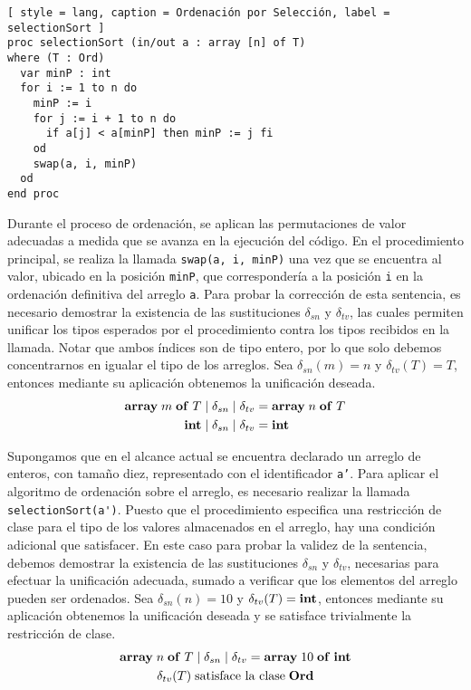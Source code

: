 \begin{lstlisting}[ style = lang, caption = Ordenación por Selección, label = selectionSort ]
proc selectionSort (in/out a : array [n] of T)
where (T : Ord)
  var minP : int
  for i := 1 to n do
    minP := i
    for j := i + 1 to n do
      if a[j] < a[minP] then minP := j fi
    od
    swap(a, i, minP)
  od
end proc
\end{lstlisting}

Durante el proceso de ordenación, se aplican las permutaciones de valor adecuadas a medida que se avanza en la ejecución del código.
En el procedimiento principal, se realiza la llamada \lstinline[style = lang]{swap(a, i, minP)} una vez que se encuentra al valor, ubicado en la posición \texttt{minP}, que correspondería a la posición \texttt{i} en la ordenación definitiva del arreglo \texttt{a}.
Para probar la corrección de esta sentencia, es necesario demostrar la existencia de las sustituciones $\delta_{sn}$ y $\delta_{tv}$, las cuales permiten unificar los tipos esperados por el procedimiento contra los tipos recibidos en la llamada.
Notar que ambos índices son de tipo entero, por lo que solo debemos concentrarnos en igualar el tipo de los arreglos.
Sea $\delta_{sn}(m) = n$ y $\delta_{tv}(T) = T$, entonces mediante su aplicación obtenemos la unificación deseada.
\begin{align*}
\mathbf{array} \; m \; \mathbf{of} \; T \mid \delta_{sn} \mid \delta_{tv}
&=
\mathbf{array} \; n \; \mathbf{of} \; T
\\
\mathbf{int} \mid \delta_{sn} \mid \delta_{tv}
&=
\mathbf{int}
\end{align*}

Supongamos que en el alcance actual se encuentra declarado un arreglo de enteros, con tamaño diez, representado con el identificador \texttt{a'}.
Para aplicar el algoritmo de ordenación sobre el arreglo, es necesario realizar la llamada \lstinline[style = lang]{selectionSort(a')}.
Puesto que el procedimiento especifica una restricción de clase para el tipo de los valores almacenados en el arreglo, hay una condición adicional que satisfacer.
En este caso para probar la validez de la sentencia, debemos demostrar la existencia de las sustituciones $\delta_{sn}$ y $\delta_{tv}$, necesarias para efectuar la unificación adecuada, sumado a verificar que los elementos del arreglo pueden ser ordenados.
Sea $\delta_{sn}(n) = 10$ y $\delta_{tv}(T) = \mathbf{int}$, entonces mediante su aplicación obtenemos la unificación deseada y se satisface trivialmente
la restricción de clase.
\begin{gather*}
\mathbf{array} \; n \; \mathbf{of} \; T \mid \delta_{sn} \mid \delta_{tv} = \mathbf{array} \; 10 \; \mathbf{of} \; \mathbf{int}
\\
\delta_{tv}(T) \; \text{satisface la clase} \; \mathbf{Ord}
\end{gather*}


